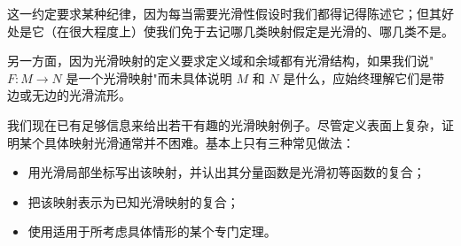 \documentclass[../../main.tex]{subfiles}
\begin{document}
这一约定要求某种纪律，因为每当需要光滑性假设时我们都得记得陈述它；但其好处是它（在很大程度上）使我们免于去记哪几类映射假定是光滑的、哪几类不是。

另一方面，因为光滑映射的定义要求定义域和余域都有光滑结构，如果我们说"$F:M\to N$ 是一个光滑映射"而未具体说明 $M$ 和 $N$ 是什么，应始终理解它们是带边或无边的光滑流形。

我们现在已有足够信息来给出若干有趣的光滑映射例子。尽管定义表面上复杂，证明某个具体映射光滑通常并不困难。基本上只有三种常见做法：
\begin{itemize}
\item 用光滑局部坐标写出该映射，并认出其分量函数是光滑初等函数的复合；
\item 把该映射表示为已知光滑映射的复合；
\item 使用适用于所考虑具体情形的某个专门定理。
\end{itemize}
\end{document}
